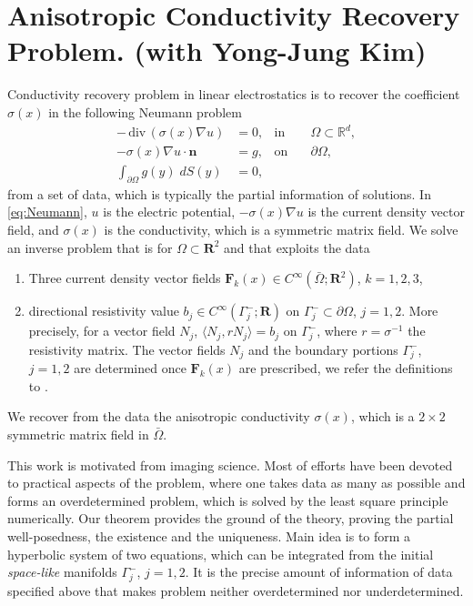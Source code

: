 \documentclass[a4paper,11pt]{article}
\def\div{\,\textrm{div}\,}
\def\F{\mathbf{F}}
\begin{document}
\section{Anisotropic Conductivity Recovery Problem. {\small(with Yong-Jung Kim)}}
Conductivity recovery problem in linear electrostatics is to recover the coefficient $\sigma(x)$ in the following Neumann problem
\begin{equation}\label{eq:Neumann}
\begin{aligned}
 -\div(\sigma(x)\nabla u) &=0, &\text{in} \quad & \Omega\subset \mathbb{R}^d,\\
 -\sigma(x)\nabla u \cdot \mathbf{n} &=g, &\text{on} \quad & \partial\Omega,\\
 \int_{\partial\Omega} g(y) \;dS(y) &=0,
\end{aligned}
\end{equation}
from a set of data, which is typically the partial information of solutions. In \eqref{eq:Neumann}, $u$ is the electric potential, $-\sigma(x)\nabla u$ is the current density vector field, and $\sigma(x)$ is the conductivity, which is a symmetric matrix field. We solve an inverse problem that is for $\Omega\subset \mathbf{R}^2$ and that exploits the data
\begin{enumerate}
 \item Three current density vector fields $\F_k(x) \in C^\infty(\bar\Omega;\mathbf{R}^2)$, $k=1,2,3$,
 \item directional resistivity value $b_j\in C^\infty(\Gamma_j^-;\mathbf{R})$ on $\Gamma_j^-\subset\partial\Omega$, $j=1,2$. More precisely, for a vector field $N_j$, $\langle N_j, rN_j\rangle = b_j$ on $\Gamma_j^-$, where $r=\sigma^{-1}$ the resistivity matrix. The vector fields $N_j$ and the boundary portions $\Gamma_j^-$, $j=1,2$ are determined once $\F_k(x)$ are prescribed, we refer the definitions to \cite{lee_well-posedness_2014}.
\end{enumerate}
We recover from the data the anisotropic conductivity $\sigma(x)$, which is a $2\times2$ symmetric matrix field in $\bar\Omega$.

This work is motivated from imaging science. Most of efforts have been devoted to practical aspects of the problem, where one takes data as many as possible and forms an overdetermined problem, which is solved by the least square principle numerically. Our theorem provides the ground of the theory, proving the partial well-posedness, the existence and the uniqueness. Main idea is to form a hyperbolic system of two equations, which can be integrated from the initial {\it space-like} manifolds $\Gamma_j^-$, $j=1,2$. It is the precise amount of information of data specified above that makes problem neither overdetermined nor underdetermined.
\end{document}
